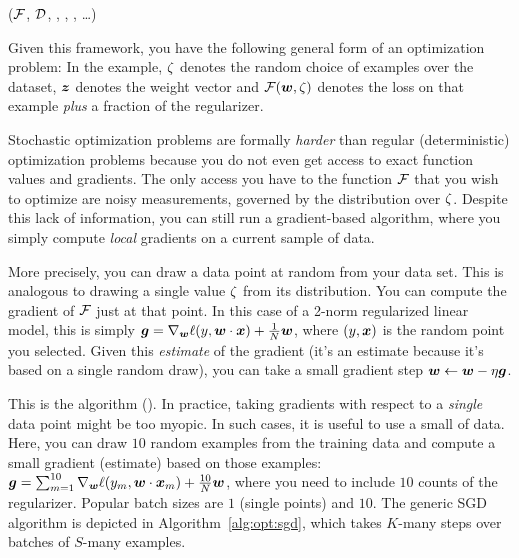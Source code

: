 %
  {($\mathcal{F}$, $\mathcal{D}$, , , , \dots)}
  {
\SETST{$\vz\kth$}{$\VARm{\vz\kpth} - \VARm{\eta}\VARm{\kth} \VARm{\vg\kth}$}
\ENDFOR
\RETURN \VARm{$\vz\Kth$}
}

Given this framework, you have the following general form of an
optimization problem:
%
%
In the example, $\zeta$ denotes the random choice of examples over the
dataset, ${\boldsymbol{z}}$ denotes the weight vector and $\mathcal{F}({\boldsymbol{w}},\zeta)$ denotes
the loss on that example \emph{plus} a fraction of the regularizer.

Stochastic optimization problems are formally \emph{harder} than
regular (deterministic) optimization problems because you do not even
get access to exact function values and gradients.  The only access
you have to the function $\mathcal{F}$ that you wish to optimize are noisy
measurements, governed by the distribution over $\zeta$.  Despite this
lack of information, you can still run a gradient-based algorithm,
where you simply compute \emph{local} gradients on a current sample of
data.

More precisely, you can draw a data point at random from your data
set.  This is analogous to drawing a single value $\zeta$ from its
distribution.  You can compute the gradient of $\mathcal{F}$ just at that
point.  In this case of a 2-norm regularized linear model, this is
simply ${\boldsymbol{g}} = \nabla_{{\boldsymbol{w}}} \ell(y, {\boldsymbol{w}} \cdot {\boldsymbol{x}}) + \frac 1 N {\boldsymbol{w}}$,
where $(y,{\boldsymbol{x}})$ is the random point you selected.  Given this
\emph{estimate} of the gradient (it's an estimate because it's based
on a single random draw), you can take a small gradient step ${\boldsymbol{w}}
\leftarrow {\boldsymbol{w}} - \eta {\boldsymbol{g}}$.

This is the  algorithm
().  In practice, taking gradients with respect to a
\emph{single} data point might be too myopic.  In such cases, it is
useful to use a small  of data.  Here, you can draw
$10$ random examples from the training data and compute a small
gradient (estimate) based on those examples: ${\boldsymbol{g}} = \sum_{m=1}^{10}
\nabla_{{\boldsymbol{w}}} \ell(y_m, {\boldsymbol{w}} \cdot {\boldsymbol{x}}_m) + \frac {10} N {\boldsymbol{w}}$, where
you need to include $10$ counts of the regularizer.  Popular batch
sizes are $1$ (single points) and $10$.  The generic SGD algorithm is
depicted in Algorithm~\ref{alg:opt:sgd}, which takes $K$-many steps
over batches of $S$-many examples.

